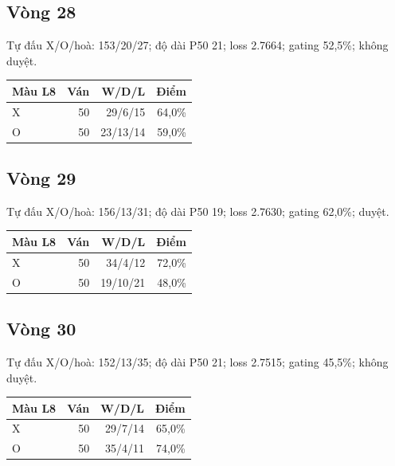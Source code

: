 \subsection*{Vòng 28}

Tự đấu X/O/hoà: 153/20/27; độ dài P50 21; loss 2.7664; gating 52,5\%; không duyệt.

\begin{center}\scriptsize\begin{tabular}{@{}lrrr@{}}\toprule

Màu L8 & Ván & W/D/L & Điểm \\

\midrule

X & 50 & 29/6/15 & 64,0\% \\

O & 50 & 23/13/14 & 59,0\% \\

\bottomrule\end{tabular}\end{center}

\subsection*{Vòng 29}

Tự đấu X/O/hoà: 156/13/31; độ dài P50 19; loss 2.7630; gating 62,0\%; duyệt.

\begin{center}\scriptsize\begin{tabular}{@{}lrrr@{}}\toprule

Màu L8 & Ván & W/D/L & Điểm \\

\midrule

X & 50 & 34/4/12 & 72,0\% \\

O & 50 & 19/10/21 & 48,0\% \\

\bottomrule\end{tabular}\end{center}

\subsection*{Vòng 30}

Tự đấu X/O/hoà: 152/13/35; độ dài P50 21; loss 2.7515; gating 45,5\%; không duyệt.

\begin{center}\scriptsize\begin{tabular}{@{}lrrr@{}}\toprule

Màu L8 & Ván & W/D/L & Điểm \\

\midrule

X & 50 & 29/7/14 & 65,0\% \\

O & 50 & 35/4/11 & 74,0\% \\

\bottomrule\end{tabular}\end{center}

